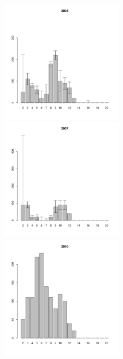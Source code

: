 	\begin{figure}[hp]

	\begin{minipage}[b]{.3\linewidth}
	\begin{center}
	\includegraphics[width=60mm]{../White_Sea/Luvenga_Goreliy/midlow2_2004_.pdf}
	\end{center}
	\end{minipage}
	\hfill
	\begin{minipage}[b]{.3\linewidth}
	\begin{center}
	\includegraphics[width=60mm]{../White_Sea/Luvenga_Goreliy/midlow2_2007_.pdf}
	\end{center}
	\end{minipage}
	\hfill
	\begin{minipage}[b]{.3\linewidth}
	\begin{center}
	\includegraphics[width=60mm]{../White_Sea/Luvenga_Goreliy/midlow2_2010_.pdf}

\end{center}
\end{minipage}
\end{figure}
